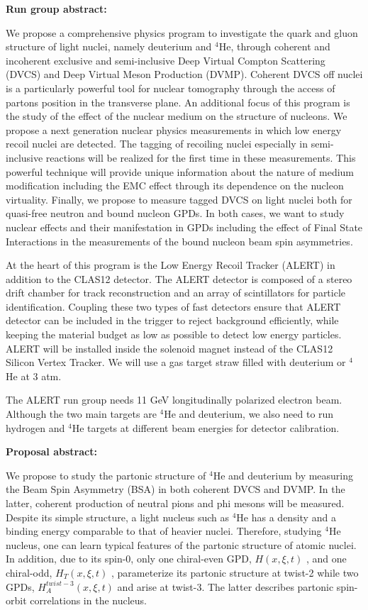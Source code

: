 {\large\textbf{Run group abstract:}}
\newline

We propose a comprehensive physics program to investigate the quark and
gluon structure of light nuclei, namely deuterium and $^4$He, through coherent and
incoherent exclusive and semi-inclusive Deep Virtual Compton Scattering (DVCS) and
Deep Virtual Meson Production (DVMP). Coherent DVCS off nuclei is a particularly
powerful tool for nuclear tomography through the access of partons position in the
transverse plane. An additional focus of this program is the study of the effect of the
nuclear medium on the structure of nucleons. We propose a next generation nuclear
physics measurements in which low energy recoil nuclei are detected. The tagging of
recoiling nuclei especially in semi-inclusive reactions will be realized for the first time in
these measurements. This powerful technique will provide unique information about the
nature of medium modification including the EMC effect through its dependence on the
nucleon virtuality. Finally, we propose to measure tagged DVCS on light nuclei both for
quasi-free neutron and bound nucleon GPDs. In both cases, we want to study nuclear
effects and their manifestation in GPDs including the effect of Final State Interactions in
the measurements of the bound nucleon beam spin asymmetries.

At the heart of this program is the Low Energy Recoil Tracker (ALERT) in addition
to the CLAS12 detector. The ALERT detector is composed of a stereo drift chamber for
track reconstruction and an array of scintillators for particle identification. Coupling these
two types of fast detectors ensure that ALERT detector can be included in the trigger to
reject background efficiently, while keeping the material budget as low as possible to
detect low energy particles. ALERT will be installed inside the solenoid magnet instead
of the CLAS12 Silicon Vertex Tracker. We will use a gas target straw filled with
deuterium or $^4$He at 3 atm.

The ALERT run group needs 11 GeV longitudinally polarized electron beam.
Although the two main targets are $^4$He and deuterium, we also need to run hydrogen and
$^4$He targets at different beam energies for detector calibration.

\newpage
{\large\textbf{Proposal abstract:}}
\newline

We propose to study the partonic structure of $^4$He and deuterium by measuring
the Beam Spin Asymmetry (BSA) in both coherent DVCS and DVMP. In the latter,
coherent production of neutral pions and phi mesons will be measured. Despite its
simple structure, a light nucleus such as $^4$He has a density and a binding energy
comparable to that of heavier nuclei. Therefore, studying $^4$He nucleus, one can learn
typical features of the partonic structure of atomic nuclei. In addition, due to its spin-0,
only one chiral-even GPD, $H (x, \xi , t)$ , and one chiral-odd, $H_T (x, \xi , t)$ , parameterize its
partonic structure at twist-2 while two GPDs, $H_A^{twist-3} (x, \xi , t)$ and
arise at twist-3. The latter describes partonic spin-orbit correlations in the nucleus.


